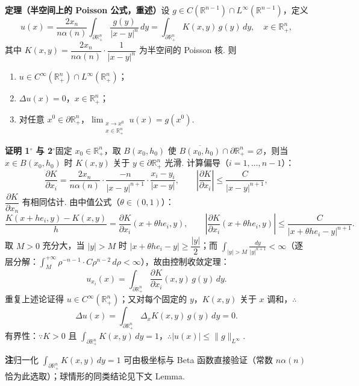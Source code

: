 \documentclass{article}
\begin{document}
\noindent\textbf{定理（半空间上的 Poisson 公式，重述）}\quad 设 $g \in C(\mathbb{R}^{n-1}) \cap L^\infty(\mathbb{R}^{n-1})$，定义
\[
u(x) = \frac{2x_n}{n\alpha(n)} \int_{\partial \mathbb{R}^n_+} \frac{g(y)}{|x-y|^n}\, dy = \int_{\partial \mathbb{R}^n_+} K(x,y)\, g(y)\, dy, \quad x \in \mathbb{R}^n_+,
\]
其中 $K(x,y) = \dfrac{2x_n}{n\alpha(n)} \cdot \dfrac{1}{|x-y|^n}$ 为半空间的 Poisson 核. 则
\begin{enumerate}[label=\arabic*$^\circ$, left=0pt]
	
	\item $u \in C^\infty(\mathbb{R}^n_+) \cap L^\infty(\mathbb{R}^n_+)$；
	\item $\Delta u(x) = 0$，$x \in \mathbb{R}^n_+$；
	\item 对任意 $x^0 \in \partial \mathbb{R}^n_+$，$\displaystyle \lim_{\substack{x \to x^0 \\ x \in \mathbb{R}^n_+}} u(x) = g(x^0)$.
\end{enumerate}

\noindent\textbf{证明 1$^\circ$ 与 2$^\circ$}\quad 固定 $x_0 \in \mathbb{R}^n_+$，取 $B(x_0, h_0)$ 使 $\overline{B(x_0,h_0)} \cap \partial \mathbb{R}^n_+ = \varnothing$，则当 $x \in B(x_0,h_0)$ 时 $K(x,y)$ 关于 $y \in \partial \mathbb{R}^n_+$ 光滑. 计算偏导（$i = 1,\dots,n-1$）：
\[
\frac{\partial K}{\partial x_i} = \frac{2x_n}{n\alpha(n)} \cdot \frac{-n}{|x-y|^{n+1}} \cdot \frac{x_i - y_i}{|x-y|}, \qquad \left| \frac{\partial K}{\partial x_i} \right| \leq \frac{C}{|x-y|^{n+1}},
\]
$\dfrac{\partial K}{\partial x_n}$ 有相同估计. 由中值公式（$\theta \in (0,1)$）：
\[
\frac{K(x+he_i, y) - K(x,y)}{h} = \frac{\partial K}{\partial x_i}(x + \theta h e_i, y), \qquad \left| \frac{\partial K}{\partial x_i}(x+\theta h e_i, y) \right| \leq \frac{C}{|x + \theta h e_i - y|^{n+1}}.
\]
取 $M>0$ 充分大，当 $|y| > M$ 时 $|x + \theta h e_i - y| \geq \dfrac{|y|}{2}$；而 $\displaystyle \int_{|y|>M} \frac{dy}{|y|^{n+1}} < \infty$（逐层分解：$\int_M^{+\infty} \rho^{-n-1} \cdot C\rho^{n-2}\, d\rho < \infty$），故由控制收敛定理：
\[
u_{x_i}(x) = \int_{\partial \mathbb{R}^n_+} \frac{\partial K}{\partial x_i}(x,y)\, g(y)\, dy.
\]
重复上述论证得 $u \in C^\infty(\mathbb{R}^n_+)$；又对每个固定的 $y$，$K(x,y)$ 关于 $x$ 调和，$\therefore$
\[
\Delta u(x) = \int_{\partial \mathbb{R}^n_+} \Delta_x K(x,y)\, g(y)\, dy = 0.
\]
有界性：$\because K > 0$ 且 $\displaystyle \int_{\partial \mathbb{R}^n_+} K(x,y)\, dy = 1$，$\therefore |u(x)| \leq \|g\|_{L^\infty}$.

\noindent\textbf{注}\quad 归一化 $\displaystyle \int_{\partial \mathbb{R}^n_+} K(x,y)\, dy = 1$ 可由极坐标与 Beta 函数直接验证（常数 $n\alpha(n)$ 恰为此选取）；球情形的同类结论见下文 Lemma.
\end{document}
